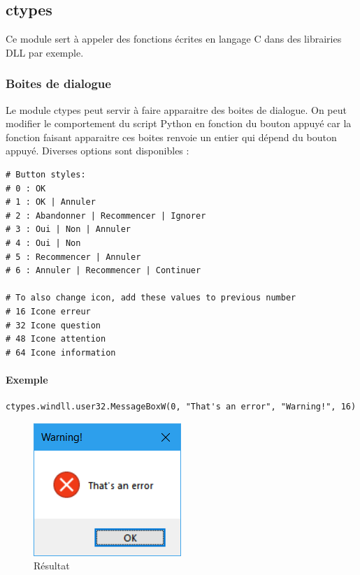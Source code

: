 \documentclass[a4paper, french, 10pt]{article}
\begin{document}
\subsection{ctypes}
 Ce module sert à appeler des fonctions écrites en langage C dans des librairies DLL par exemple.
\subsubsection{Boites de dialogue}
 Le module ctypes peut servir à faire apparaitre des boites de dialogue. On peut modifier le comportement du script Python en fonction du bouton appuyé car la fonction faisant apparaitre ces boites renvoie un entier qui dépend du bouton appuyé. Diverses options sont disponibles :
\begin{verbatim}
# Button styles:
# 0 : OK
# 1 : OK | Annuler
# 2 : Abandonner | Recommencer | Ignorer
# 3 : Oui | Non | Annuler
# 4 : Oui | Non
# 5 : Recommencer | Annuler
# 6 : Annuler | Recommencer | Continuer

# To also change icon, add these values to previous number
# 16 Icone erreur
# 32 Icone question
# 48 Icone attention
# 64 Icone information
\end{verbatim}

\paragraph{Exemple}
\begin{verbatim}
ctypes.windll.user32.MessageBoxW(0, "That's an error", "Warning!", 16)
\end{verbatim}
\begin{figure}[h]
\begin{center}
\includegraphics[scale=0.5]{errorwindow.png}
\caption*{Résultat}
\end{center}
\end{figure}
\end{document}
